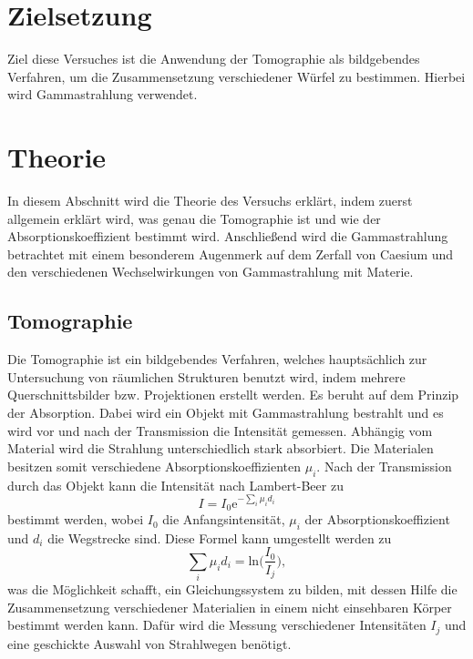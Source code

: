 \section{Zielsetzung}
\label{sec:Zielsetzung}
Ziel diese Versuches ist die Anwendung der Tomographie als bildgebendes Verfahren, um die Zusammensetzung verschiedener Würfel zu bestimmen.
Hierbei wird Gammastrahlung verwendet.

\section{Theorie}
\label{sec:Theorie}
In diesem Abschnitt wird die Theorie des Versuchs erklärt, indem zuerst allgemein erklärt wird, was genau die Tomographie ist und wie der Absorptionskoeffizient bestimmt wird.
Anschließend wird die Gammastrahlung betrachtet mit einem besonderem Augenmerk auf dem Zerfall von Caesium und den verschiedenen
Wechselwirkungen von Gammastrahlung mit Materie. 

\subsection{Tomographie}
\label{subsec:Tomographie}
Die Tomographie ist ein bildgebendes Verfahren, welches hauptsächlich zur Untersuchung von räumlichen Strukturen benutzt wird,
indem mehrere Querschnittsbilder bzw. Projektionen erstellt werden.
Es beruht auf dem Prinzip der Absorption. Dabei wird ein Objekt mit Gammastrahlung bestrahlt und es wird vor und nach der Transmission die
Intensität gemessen. Abhängig vom Material wird die Strahlung unterschiedlich stark absorbiert. Die Materialen besitzen somit verschiedene
Absorptionskoeffizienten $\mu_i$.
Nach der Transmission durch das Objekt kann die Intensität nach Lambert-Beer zu
\begin{equation*}
    I = I_0 \text{e}^{-\sum_i \mu_i d_i}
\end{equation*}
bestimmt werden, wobei $I_0$ die Anfangsintensität, $\mu_i$ der Absorptionskoeffizient und $d_i$ die Wegstrecke sind.
Diese Formel kann umgestellt werden zu
\begin{equation}
    \sum_i \mu_i d_i = \text{ln}\biggl(\frac{I_0}{I_j}\biggr),
    \label{eqn:mu}
\end{equation}
was die Möglichkeit schafft, ein Gleichungssystem zu bilden, mit dessen Hilfe die Zusammensetzung verschiedener Materialien in einem nicht
einsehbaren Körper bestimmt werden kann.
Dafür wird die Messung verschiedener Intensitäten $I_j$ und eine geschickte Auswahl von Strahlwegen benötigt.

